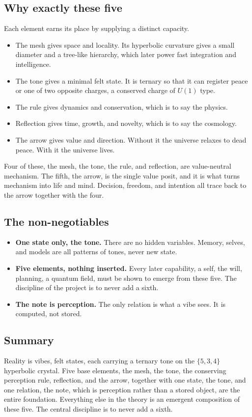 \subsection{Why exactly these five}

Each element earns its place by supplying a distinct capacity.

\begin{itemize}
  \item The mesh gives space and locality. Its hyperbolic curvature gives a small diameter and a tree-like hierarchy, which later power fast integration and intelligence.
  \item The tone gives a minimal felt state. It is ternary so that it can register peace or one of two opposite charges, a conserved charge of $U(1)$ type.
  \item The rule gives dynamics and conservation, which is to say the physics.
  \item Reflection gives time, growth, and novelty, which is to say the cosmology.
  \item The arrow gives value and direction. Without it the universe relaxes to dead peace. With it the universe lives.
\end{itemize}

Four of these, the mesh, the tone, the rule, and reflection, are value-neutral mechanism. The fifth, the arrow, is the single value posit, and it is what turns mechanism into life and mind. Decision, freedom, and intention all trace back to the arrow together with the four.

\subsection{The non-negotiables}

\begin{itemize}
  \item \textbf{One state only, the tone.} There are no hidden variables. Memory, selves, and models are all patterns of tones, never new state.
  \item \textbf{Five elements, nothing inserted.} Every later capability, a self, the will, planning, a quantum field, must be shown to emerge from these five. The discipline of the project is to never add a sixth.
  \item \textbf{The note is perception.} The only relation is what a vibe sees. It is computed, not stored.
\end{itemize}

\subsection{Summary}

Reality is vibes, felt states, each carrying a ternary tone on the $\{5,3,4\}$ hyperbolic crystal. Five base elements, the mesh, the tone, the conserving perception rule, reflection, and the arrow, together with one state, the tone, and one relation, the note, which is perception rather than a stored object, are the entire foundation. Everything else in the theory is an emergent composition of these five. The central discipline is to never add a sixth.
